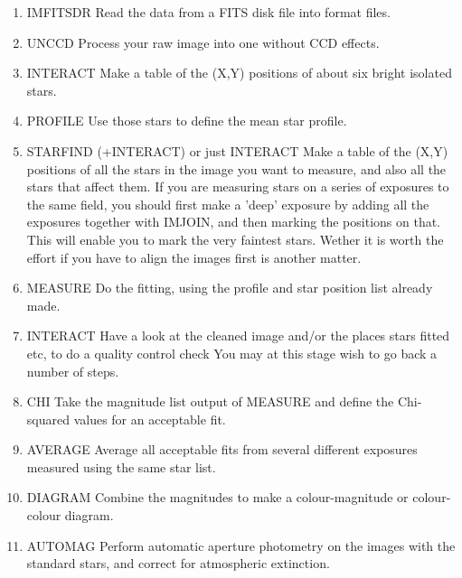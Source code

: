  \begin{enumerate}
 
 \item IMFITS{\undersc}DR \newline
       Read the data from a FITS disk file into \starman format files.
 
 \item UNCCD \newline
       Process your raw image into one without CCD effects.
 
 \item INTERACT \newline    Make a table of the (X,Y) positions of about six bright
                isolated stars.
 
 \item PROFILE \newline    Use those stars to define the mean star profile.
 
 \item STARFIND (+INTERACT) or just INTERACT \newline
        Make a table of the (X,Y) positions of all the stars in the image
        you want to measure, and also all the stars that
        affect them. If you are measuring stars on a series
        of exposures to the same field, you should first make a
        'deep' exposure by adding all the exposures together
        with IMJOIN, and then marking the positions on that.
        This will enable you to mark the very faintest stars.
        Wether it is worth the effort if you have to align the
        images first is another matter.
 
 \item MEASURE   \newline Do the fitting, using the profile and star position
                list already made.
 
 \item INTERACT    \newline Have a look at the cleaned image and/or the places
          stars fitted etc, to do a quality control check
          You may at this stage wish to go back a number of steps.
 
 \item  CHI \newline Take the magnitude list output of MEASURE and define
                the Chi-squared values for an acceptable fit.
 
 \item AVERAGE     \newline Average all acceptable fits from several different
                exposures measured using the same star list.
 
 \item DIAGRAM  \newline   Combine the magnitudes to make a colour-magnitude
                or colour-colour diagram.
 
 \item AUTOMAG \newline Perform automatic aperture photometry on the images
               with the standard stars, and correct for atmospheric
               extinction.
 
\end{enumerate}
 
